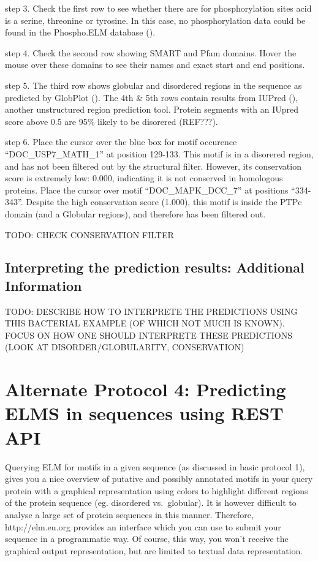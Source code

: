 step 3. Check the first row to see whether there are for phosphorylation
sites acid is a serine, threonine or tyrosine. In this case, no
phosphorylation data could be found in the Phospho.ELM database
(\cite{21062810}).

step 4. Check the second row showing SMART and Pfam domains. Hover the
mouse over these domains to see their names and exact start and end
positions.

step 5. The third row shows globular and disordered regions in the
sequence as predicted by GlobPlot (\cite{12824398}). The 4th \& 5th rows
contain results from IUPred (\cite{15955779}), another unstructured
region prediction tool. Protein segments with an IUpred score above 0.5
are 95\% likely to be disorered (REF???).

step 6. Place the cursor over the blue box for motif occurence
``DOC\_USP7\_MATH\_1'' at position 129-133. This motif is in a disorered
region, and has not been filtered out by the structural filter. However,
its conservation score is extremely low: 0.000, indicating it is not
conserved in homologous proteins. Place the cursor over motif
``DOC\_MAPK\_DCC\_7'' at positions ``334-343''. Despite the high
conservation score (1.000), this motif is inside the PTPc domain (and a
Globular regions), and therefore has been filtered out.

TODO: CHECK CONSERVATION FILTER

\subsection{Interpreting the prediction results: Additional
Information}\label{interpreting-the-prediction-results-additional-information}

TODO: DESCRIBE HOW TO INTERPRETE THE PREDICTIONS USING THIS BACTERIAL
EXAMPLE (OF WHICH NOT MUCH IS KNOWN). FOCUS ON HOW ONE SHOULD INTERPRETE
THESE PREDICTIONS (LOOK AT DISORDER/GLOBULARITY, CONSERVATION)

\section{Alternate Protocol 4: Predicting ELMS in sequences using REST
API}\label{alternate-protocol-4-predicting-elms-in-sequences-using-rest-api}

Querying ELM for motifs in a given sequence (as discussed in basic
protocol 1), gives you a nice overview of putative and possibly
annotated motifs in your query protein with a graphical representation
using colors to highlight different regions of the protein sequence (eg.
disordered vs.~globular). It is however difficult to analyse a large set
of protein sequences in this manner. Therefore, http://elm.eu.org
provides an interface which you can use to submit your sequence in a
programmatic way. Of course, this way, you won't receive the graphical
output representation, but are limited to textual data representation.

